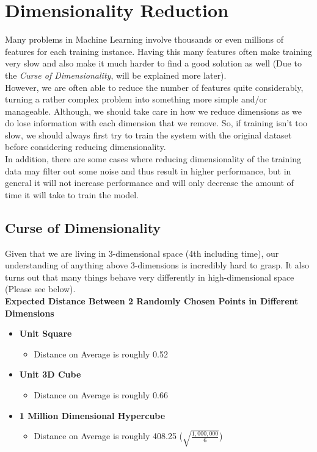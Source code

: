
\section{Dimensionality Reduction}

Many problems in Machine Learning involve thousands or even millions of features for each training instance.
Having this many features often make training very slow and also make it much harder to find a good solution
as well (Due to the \textit{Curse of Dimensionality}, will be explained more later). \\

\noindent
However, we are often able to reduce the number of features quite considerably, turning a rather complex 
problem into something more simple and/or manageable. Although, we should take care in how we reduce dimensions
as we do lose information with each dimension that we remove. So, if training isn't too slow, we should always
first try to train the system with the original dataset before considering reducing dimensionality. \\

\noindent 
In addition, there are some cases where reducing dimensionality of the training data may filter out some noise
and thus result in higher performance, but in general it will not increase performance and will only decrease
the amount of time it will take to train the model.

\subsection{Curse of Dimensionality}

Given that we are living in 3-dimensional space (4th including time), our understanding of anything above
3-dimensions is incredibly hard to grasp. It also turns out that many things behave very differently in 
high-dimensional space (Please see below). \\

\noindent
\textbf{Expected Distance Between 2 Randomly Chosen Points in Different Dimensions}
\begin{itemize}
    \item \textbf{Unit Square}
        \begin{itemize}
            \item Distance on Average is roughly 0.52
        \end{itemize}
    \item \textbf{Unit 3D Cube}
        \begin{itemize}
            \item Distance on Average is roughly 0.66
        \end{itemize}
    \item \textbf{1 Million Dimensional Hypercube}
        \begin{itemize}
            \item Distance on Average is roughly 408.25 ($\sqrt{\frac{1,000,000}{6}}$)
        \end{itemize}
\end{itemize}

